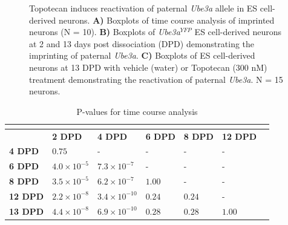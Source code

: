 \begin{figure}[!h]
{
  }
  \caption{Topotecan induces reactivation of paternal \emph{Ube3a} allele in ES cell-derived neurons. \textbf{A)} Boxplots of time course analysis of imprinted neurons (N = 10). \textbf{B)} Boxplots of \emph{Ube3a$^{YFP}$} ES cell-derived neurons at 2 and 13 days post dissociation (DPD) demonstrating the imprinting of paternal \emph{Ube3a}. \textbf{C)} Boxplots of ES cell-derived neurons at 13 DPD with vehicle (water) or Topotecan (300 nM) treatment demonstrating the reactivation of paternal \emph{Ube3a}. N = 15 neurons.}
  \label{Figure 5-1: }
\end{figure}

\pagebreak

\begin{longtabu} to \textwidth {X[c]X[c]X[c]X[c]X[c]X[c]X[c]}
  \caption{P-values for time course analysis}\\
  \label{table:5-1}\\
  \toprule
  & \textbf{2 DPD} & \textbf{4 DPD} & \textbf{6 DPD} & \textbf{8 DPD} & \textbf{12 DPD}\\
  \midrule
  \endhead
  \textbf{4 DPD}  & $0.75$               & -                     & -      & -      & -     \\
  \textbf{6 DPD}  & $4.0 \times 10^{-5}$ & $7.3 \times 10^{-7}$  & -      & -      & -     \\
  \textbf{8 DPD}  & $3.5 \times 10^{-5}$ & $6.2 \times 10^{-7}$  & $1.00$ & -      & -     \\
  \textbf{12 DPD} & $2.2 \times 10^{-8}$ & $3.4 \times 10^{-10}$ & $0.24$ & $0.24$ & -     \\
  \textbf{13 DPD} & $4.4 \times 10^{-8}$ & $6.9 \times 10^{-10}$ & $0.28$ & $0.28$ & $1.00$\\
  \bottomrule
\end{longtabu}

